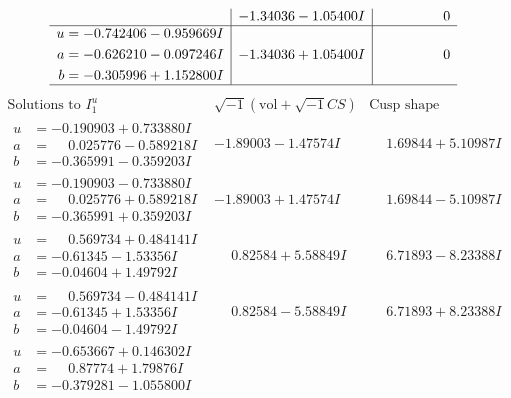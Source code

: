 \documentclass[1p]{elsarticle_modified}
\theoremstyle{definition}
\newcommand{\I}{\sqrt{-1}}
\begin{document}
$$\begin{array}{c|c|c}
 & -1.34036 - 1.05400 I & \phantom{-0.000000 } 0 \\ \hline\begin{aligned}
u &= -0.742406 - 0.959669 I \\
a &= -0.626210 - 0.097246 I \\
b &= -0.305996 + 1.152800 I\end{aligned}
 & -1.34036 + 1.05400 I & \phantom{-0.000000 } 0\\
 \hline 
 \end{array}$$\newpage$$\begin{array}{c|c|c}  
\text{Solutions to }I^u_{1}& \I (\text{vol} + \sqrt{-1}CS) & \text{Cusp shape}\\
 \hline 
\begin{aligned}
u &= -0.190903 + 0.733880 I \\
a &= \phantom{-}0.025776 - 0.589218 I \\
b &= -0.365991 - 0.359203 I\end{aligned}
 & -1.89003 - 1.47574 I & \phantom{-}1.69844 + 5.10987 I \\ \hline\begin{aligned}
u &= -0.190903 - 0.733880 I \\
a &= \phantom{-}0.025776 + 0.589218 I \\
b &= -0.365991 + 0.359203 I\end{aligned}
 & -1.89003 + 1.47574 I & \phantom{-}1.69844 - 5.10987 I \\ \hline\begin{aligned}
u &= \phantom{-}0.569734 + 0.484141 I \\
a &= -0.61345 - 1.53356 I \\
b &= -0.04604 + 1.49792 I\end{aligned}
 & \phantom{-}0.82584 + 5.58849 I & \phantom{-}6.71893 - 8.23388 I \\ \hline\begin{aligned}
u &= \phantom{-}0.569734 - 0.484141 I \\
a &= -0.61345 + 1.53356 I \\
b &= -0.04604 - 1.49792 I\end{aligned}
 & \phantom{-}0.82584 - 5.58849 I & \phantom{-}6.71893 + 8.23388 I \\ \hline\begin{aligned}
u &= -0.653667 + 0.146302 I \\
a &= \phantom{-}0.87774 + 1.79876 I \\
b &= -0.379281 - 1.055800 I\end{aligned}

\end{array}$$
\end{document}
